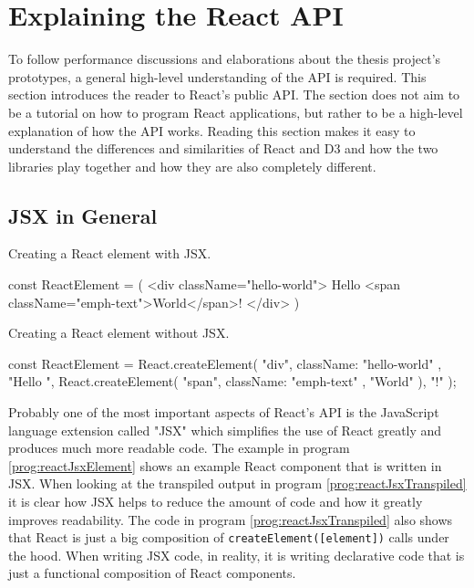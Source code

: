 \section{Explaining the React API}
\label{sec:reactApi}

To follow performance discussions and elaborations about the thesis project's prototypes, a general high-level understanding of the API is required. This section introduces the reader to React's public API. The section does not aim to be a tutorial on how to program React applications, but rather to be a high-level explanation of how the API works. Reading this section makes it easy to understand the differences and similarities of React and D3 and how the two libraries play together and how they are also completely different.

\subsection{JSX in General}

\begin{program}
\caption{Creating a React element with JSX.} 
\label{prog:reactJsxElement}
\begin{JsCode}
const ReactElement = (
  <div className="hello-world">
    Hello <span className="emph-text">World</span>!
  </div>
)
\end{JsCode}
\end{program}

\begin{program}
\caption{Creating a React element without JSX.} 
\label{prog:reactJsxTranspiled}
\begin{JsCode}
const ReactElement = React.createElement(
  "div", 
  { className: "hello-world" }, 
  "Hello ", 
  React.createElement(
    "span", 
    { className: "emph-text" }, 
    "World"
  ), 
  "!"
);
\end{JsCode}
\end{program}

Probably one of the most important aspects of React's API is the JavaScript language extension called "JSX" which simplifies the use of React greatly and produces much more readable code. The example in program \ref{prog:reactJsxElement} shows an example React component that is written in JSX. When looking at the transpiled output in program \ref{prog:reactJsxTranspiled} it is clear how JSX helps to reduce the amount of code and how it greatly improves readability. The code in program \ref{prog:reactJsxTranspiled} also shows that React is just a big composition of \texttt{createElement([element])} calls under the hood. When writing JSX code, in reality, it is writing declarative code that is just a functional composition of React components. 

